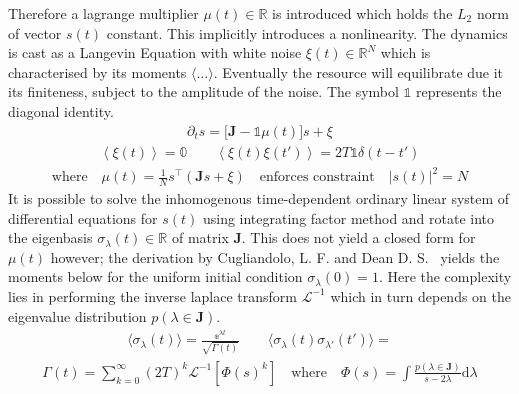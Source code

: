 \documentclass{article}[12pt]
\numberwithin{equation}{section}
\begin{document}
Therefore a lagrange multiplier $\mu(t)\in\mathbb{R}$ is introduced which holds
the $L_2$ norm of vector $s(t)$ constant. This implicitly introduces a nonlinearity.
The dynamics is cast as a Langevin Equation with white noise $\xi(t)\in\mathbb{R}^N$
which is characterised by its moments $\langle\dots\rangle$. Eventually the resource
will equilibrate due it its finiteness, subject to the amplitude of the noise.
The symbol $\mathbb{1}$ represents the diagonal identity.
\begin{align}
  \partial_t s = \big[\mathbf{J}-\mathbb{1}\mu(t)\big]s+\xi
\end{align}
\vspace{-40pt}
\begin{align}
  \left\langle\xi(t)\right\rangle=\mathbb{0}\qquad
  \left\langle\xi(t)\xi(t')\right\rangle=2T\mathbb{1}\delta(t-t')
\end{align}
\vspace{-40pt}
\begin{align}
\text{where}\quad\mu(t) = \frac{1}{N}s^{\top}\left(\mathbf{J}s+\xi\right)
\quad\text{enforces constraint}\quad|s(t)|^2=N
\label{eq:constraint}
\end{align}
It is possible to solve the inhomogenous time-dependent ordinary linear system of
differential equations for $s(t)$ using integrating factor method and rotate
into the eigenbasis $\sigma_{\lambda}(t)\in\mathbb{R}$ of matrix $\mathbf{J}$. This does not
yield a closed form for $\mu(t)$ however; the derivation by Cugliandolo, L. F.
and Dean D. S.~\cite{} yields the moments below for the uniform
initial condition $\sigma_{\lambda}(0)=1$. Here the complexity lies in performing
the inverse laplace transform $\mathcal{L}^{-1}$ which in turn depends on the
eigenvalue distribution $p(\lambda\in\mathbf{J})$.
\begin{align}
  \langle \sigma_{\lambda}(t)\rangle=
    \frac{\mathbb{e}^{\lambda t}}{\sqrt{\Gamma(t)}}\qquad
  \langle \sigma_{\lambda}(t)\sigma_{\lambda'}(t')\rangle=
\end{align}
\vspace{-30pt}
\begin{align}
  \Gamma(t)=
    \sum_{k=0}^{\infty}(2T)^k
    \mathcal{L}^{-1}\left[\Phi(s)^k\right]\quad\text{where}
    \quad
    \Phi(s)=\int\frac{p(\lambda\in\mathbf{J})}{s-2\lambda}\mathrm{d}\lambda
    \label{eq:gamma}
\end{align}
\pagebreak
\end{document}
